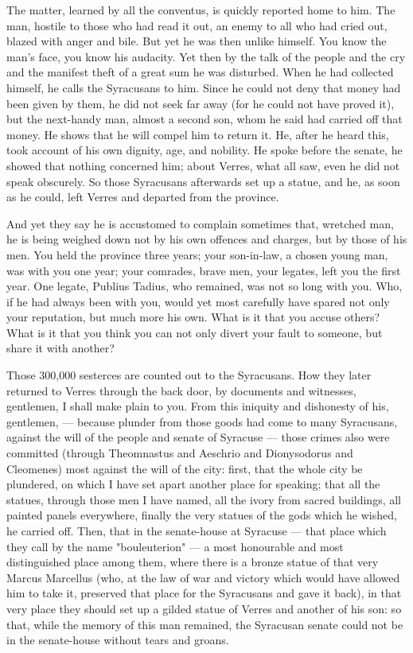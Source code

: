  The matter, learned by all the conventus, is quickly reported home to him. The man, hostile to those who had read it out, an enemy to all who had cried out, blazed with anger and bile. But yet he was then unlike himself. You know the man's face, you know his audacity. Yet then by the talk of the people and the cry and the manifest theft of a great sum he was disturbed. When he had collected himself, he calls the Syracusans to him. Since he could not deny that money had been given by them, he did not seek far away (for he could not have proved it), but the next-handy man, almost a second son, whom he said had carried off that money. He shows that he will compel him to return it. He, after he heard this, took account of his own dignity, age, and nobility. He spoke before the senate, he showed that nothing concerned him; about Verres, what all saw, even he did not speak obscurely. So those Syracusans afterwards set up a statue, and he, as soon as he could, left Verres and departed from the province.

 And yet they say he is accustomed to complain sometimes that, wretched man, he is being weighed down not by his own offences and charges, but by those of his men. You held the province three years; your son-in-law, a chosen young man, was with you one year; your comrades, brave men, your legates, left you the first year. One legate, Publius Tadius, who remained, was not so long with you. Who, if he had always been with you, would yet most carefully have spared not only your reputation, but much more his own. What is it that you accuse others? What is it that you think you can not only divert your fault to someone, but share it with another?

 Those 300,000 sesterces are counted out to the Syracusans. How they later returned to Verres through the back door, by documents and witnesses, gentlemen, I shall make plain to you. From this iniquity and dishonesty of his, gentlemen, --- because plunder from those goods had come to many Syracusans, against the will of the people and senate of Syracuse --- those crimes also were committed (through Theomnastus and Aeschrio and Dionysodorus and Cleomenes) most against the will of the city: first, that the whole city be plundered, on which I have set apart another place for speaking; that all the statues, through those men I have named, all the ivory from sacred buildings, all painted panels everywhere, finally the very statues of the gods which he wished, he carried off. Then, that in the senate-house at Syracuse --- that place which they call by the name "bouleuterion" --- a most honourable and most distinguished place among them, where there is a bronze statue of that very Marcus Marcellus (who, at the law of war and victory which would have allowed him to take it, preserved that place for the Syracusans and gave it back), in that very place they should set up a gilded statue of Verres and another of his son: so that, while the memory of this man remained, the Syracusan senate could not be in the senate-house without tears and groans.


